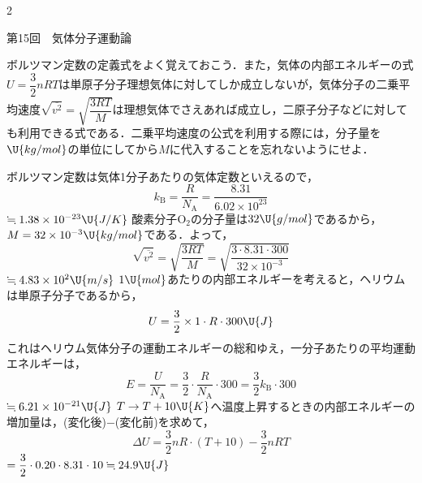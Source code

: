 \newpage

\setlength{\columnseprule}{0.4pt}
\begin{multicols}{2}
\raggedcolumns

{\gtfamily\large 第15回　気体分子運動論}\par\vspace{2mm}

\par\nopagebreak
\begin{sisin}
ボルツマン定数の定義式をよく覚えておこう．また，気体の内部エネルギーの式$U=\dfrac{3}{2}nRT$は単原子分子理想気体に対してしか成立しないが，気体分子の二乗平均速度$\sqrt{\overline{v^2}}=\sqrt{\dfrac{3RT}{M}}$は理想気体でさえあれば成立し，二原子分子などに対しても利用できる式である．二乗平均速度の公式を利用する際には，分子量を$\U{kg/mol}$の単位にしてから$M$に代入することを忘れないようにせよ．
\end{sisin}
\KaiHead
\begin{komon}
 ボルツマン定数は気体1分子あたりの気体定数といえるので，
       \[k_{\mathrm{B}}=\frac{R}{N_{\mathrm{A}}}=\frac{8.31}{6.02\times 10^{23}}\]
       \hspace*{2zw}$\fallingdotseq 1.38\times 10^{-23}\U{J/K}$\Ans
{} 酸素分子$\mathrm{O_2}$の分子量は$32\U{g/mol}$であるから，$M=32\times 10^{-3}\U{kg/mol}$である．よって，
       \[\sqrt{\overline{v^2}}=\sqrt{\frac{3RT}{M}}=\sqrt{\frac{3\cdot 8.31\cdot 300}{32\times 10^{-3}}}\]
       \hspace*{2zw}$\fallingdotseq 4.83\times 10^2\U{m/s}$\Ans
{} $1\U{mol}$あたりの内部エネルギーを考えると，ヘリウムは単原子分子であるから，
       \[U=\frac{3}{2}\times 1\cdot R\cdot 300\U{J}\]
       これはヘリウム気体分子の運動エネルギーの総和ゆえ，一分子あたりの平均運動エネルギーは，
       \[E=\frac{U}{N_{\mathrm{A}}}=\frac{3}{2}\cdot\frac{R}{N_{\mathrm{A}}}\cdot 300=\frac{3}{2}k_{\mathrm{B}}\cdot 300\]
       \hspace*{2zw}$\fallingdotseq 6.21\times 10^{-21}\U{J}$\Ans
{} $T\to T+10\U{K}$へ温度上昇するときの内部エネルギーの増加量は，(変化後)$-$(変化前)を求めて，
       \[\Delta U=\frac{3}{2}nR\cdot(T+10)-\frac{3}{2}nRT\]
       \hspace*{2zw}$=\dfrac{3}{2}\cdot 0.20\cdot 8.31\cdot 10\fallingdotseq 24.9\U{J}$\Ans
\end{komon}


\end{multicols}
